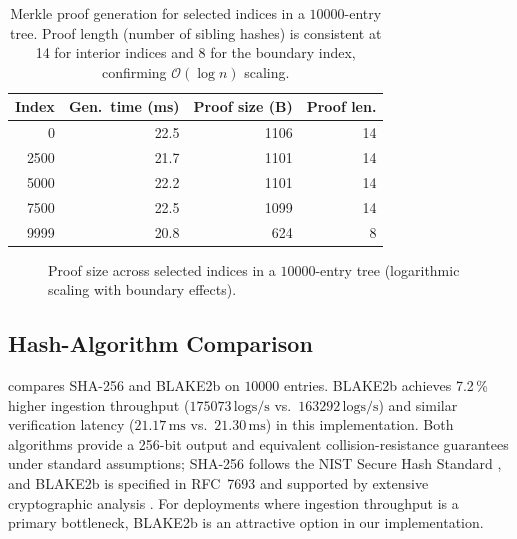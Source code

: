 \documentclass[preprint,12pt]{elsarticle}
\begin{document}
\begin{table}[t]
\centering
\caption{Merkle proof generation for selected indices in a $10000$-entry tree.  Proof length (number of sibling hashes) is consistent at 14 for interior indices and 8 for the boundary index, confirming $\mathcal{O}(\log n)$ scaling.}
\label{tab:proofs}
\small
\renewcommand{\arraystretch}{1.2}
\begin{tabular}{r
  r
  r
  r}
\toprule
{\textbf{Index}} & {\textbf{Gen.\ time (ms)}} & {\textbf{Proof size (B)}} & {\textbf{Proof len.}} \\
\midrule
    0 & 22.5 & 1106 & 14 \\
 2500 & 21.7 & 1101 & 14 \\
 5000 & 22.2 & 1101 & 14 \\
 7500 & 22.5 & 1099 & 14 \\
 9999 & 20.8 &  624 &  8 \\
\bottomrule
\end{tabular}
\end{table}

\begin{figure}[t]
\centering
{}
\caption{Proof size across selected indices in a $10000$-entry tree (logarithmic scaling with boundary effects).}
\label{fig:proof_size}
\end{figure}

\subsection{Hash-Algorithm Comparison}
\label{sec:hash_compare}

 compares SHA-256 and BLAKE2b on $10000$ entries.
BLAKE2b achieves 7.2\,\% higher ingestion throughput ($175073\,\mathrm{logs/s}$ vs.\ $163292\,\mathrm{logs/s}$) and similar verification latency ($21.17\,\mathrm{ms}$ vs.\ $21.30\,\mathrm{ms}$) in this implementation.
Both algorithms provide a 256-bit output and equivalent collision-resistance guarantees under standard assumptions; SHA-256 follows the NIST Secure Hash Standard \citep{dang2015nist}, and BLAKE2b is specified in RFC~7693 and supported by extensive cryptographic analysis \citep{aumasson2013blake2,rfc7693}.
For deployments where ingestion throughput is a primary bottleneck, BLAKE2b is an attractive option in our implementation.
\end{document}

